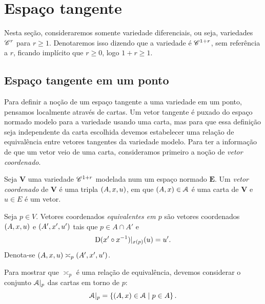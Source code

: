 \section{Espaço tangente}


Nesta seção, consideraremos somente variedade diferenciais, ou seja, variedades $\mathscr{C}^r$ para $r \geq 1$. Denotaremos isso dizendo que a variedade é $\mathscr{C}^{1+r}$, sem referência a $r$, ficando implícito que $r \geq 0$, logo $1+r \geq 1$.

\subsection{Espaço tangente em um ponto}

Para definir a noção de um espaço tangente a uma variedade em um ponto, pensamos localmente através de cartas. Um vetor tangente é puxado do espaço normado modelo para a variedade usando uma carta, mas para que essa definição seja independente da carta escolhida devemos estabelecer uma relação de equivalência entre vetores tangentes da variedade modelo. Para ter a informação de que um vetor veio de uma carta, consideramos primeiro a noção de \emph{vetor coordenado}.

\begin{definition}
Seja $\bm V$ uma variedade $\mathscr{C}^{1+r}$ modelada num um espaço normado $\bm E$. Um \emph{vetor coordenado} de $\bm V$ é uma tripla $(A,x,u)$, em que $(A,x) \in \mathcal{A}$ é uma carta de $\bm V$ e $u \in E$ é um vetor.
	
Seja $p \in V$. Vetores coordenados \emph{equivalentes em $p$} são vetores coordenados $(A,x,u)$ e $(A',x',u')$ tais que $p \in A \cap A'$ e
	\begin{equation*}
	\mathrm{D} (x' \circ x^{-1})|_{x(p)}(u) = u'.
	\end{equation*}
Denota-se $(A,x,u) \asymp_p (A',x',u')$.
\end{definition}

Para mostrar que $\asymp_p$ é uma relação de equivalência, devemos considerar o conjunto $\mathcal{A}|_p$ das cartas em torno de $p$:
	\begin{equation*}
	\mathcal{A}|_p = \left\{ (A,x) \in \mathcal{A} \;\middle\vert\; p \in A \right\}.
	\end{equation*}

